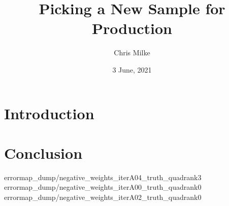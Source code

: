 \documentclass{beamer}
\begin{document}
    \title{Picking a New Sample for Production}
    \author{Chris Milke}
    \date{3 June, 2021}

    \frame{\titlepage}

    \section{Introduction}
    
    

    

    
    
    
    


    \section{Conclusion}
    {errormap_dump/negative_weights_iterA04_truth_quadrank3}
    {errormap_dump/negative_weights_iterA00_truth_quadrank0}
    {errormap_dump/negative_weights_iterA02_truth_quadrank0}

\end{document}
